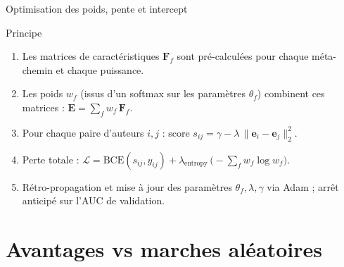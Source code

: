 \documentclass[9pt,aspectratio=169,professionalfonts]{beamer}
\begin{document}
\begin{frame}{Optimisation des poids, pente et intercept}
\begin{block}{Principe}
\begin{enumerate}
  \item Les matrices de caractéristiques \(\mathbf{F}_f\) sont pré-calculées pour chaque méta-chemin et chaque puissance.
  \item Les poids \(w_f\) (issus d'un softmax sur les paramètres \(\theta_f\)) combinent ces matrices : \(\mathbf{E}=\sum_f w_f\,\mathbf{F}_f\).
  \item Pour chaque paire d'auteurs \(i,j\) : score \(s_{ij}=\gamma-\lambda\,\|\mathbf{e}_i-\mathbf{e}_j\|_2^2\).
  \item Perte totale : \( \mathcal L = \text{BCE}(s_{ij},y_{ij}) + \lambda_{\text{entropy}}\,\bigl(-\sum_f w_f\log w_f\bigr)\).
  \item Rétro-propagation et mise à jour des paramètres \(\theta_f,\lambda,\gamma\) via Adam ; arrêt anticipé sur l'AUC de validation.
\end{enumerate}
\end{block}
\end{frame}

\section{Avantages vs marches aléatoires}
\end{document}
